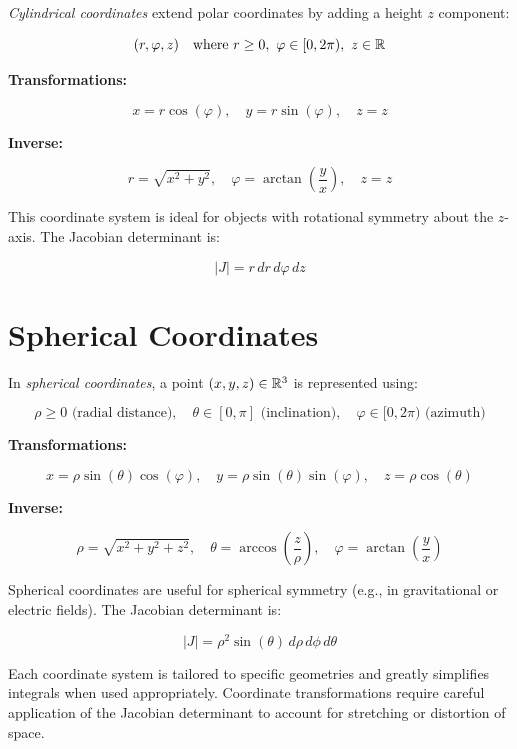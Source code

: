 \emph{Cylindrical coordinates} extend polar coordinates by adding a height \(z\) component:

\[
    (r, \varphi, z) \quad \text{where } r \ge 0, \ \varphi \in [0, 2\pi), \ z \in \mathbb{R}
\]

\textbf{Transformations:}

\[
    x = r \cos(\varphi), \quad y = r \sin(\varphi), \quad z = z
\]

\textbf{Inverse:}

\[
    r = \sqrt{x^2 + y^2}, \quad \varphi = \arctan\left(\frac{y}{x}\right), \quad z = z
\]

This coordinate system is ideal for objects with rotational symmetry about the \(z\)-axis. 
The Jacobian determinant is:

\[
    |J| = r \, dr \, d\varphi \, dz
\]

\section{Spherical Coordinates}

In \emph{spherical coordinates}, a point \( (x, y, z) \in \mathbb{R}^3 \) is represented using:

\[
    \rho \ge 0 \text{ (radial distance)}, \quad \theta \in [0, \pi] \text{ (inclination)}, \quad 
    \varphi \in [0, 2\pi) \text{ (azimuth)}
\]

\textbf{Transformations:}

\[
    x = \rho \sin(\theta)\cos(\varphi), \quad y = \rho \sin(\theta) \sin(\varphi), \quad z = \rho \cos 
    (\theta)
\]

\textbf{Inverse:}

\[
    \rho = \sqrt{x^2 + y^2 + z^2}, \quad \theta = \arccos\left(\frac{z}{\rho}\right), \quad 
    \varphi = \arctan\left(\frac{y}{x}\right)
\]

Spherical coordinates are useful for spherical symmetry (e.g., in gravitational or electric fields). 
The Jacobian determinant is:

\[
    |J| = \rho^2 \sin(\theta) \, d\rho \, d\phi \, d\theta
\]

Each coordinate system is tailored to specific geometries and greatly simplifies integrals when used 
appropriately. Coordinate transformations require careful application of the Jacobian 
determinant to account for stretching or distortion of space.


